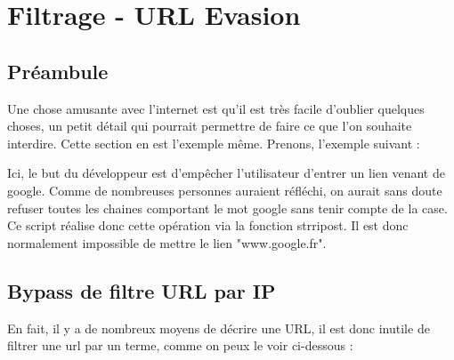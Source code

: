 \documentclass{article}
\begin{document}
\newpage
\section{Filtrage - URL Evasion}
\subsection{Préambule}
Une chose amusante avec l'internet est qu'il est très facile d'oublier quelques choses, un petit détail qui pourrait permettre de faire ce que l'on souhaite interdire. Cette section en est l'exemple même. Prenons, l'exemple suivant :
\vspace{0.2cm}\\
\vspace{0.2cm}

Ici, le but du développeur est d'empêcher l'utilisateur d'entrer un lien venant de google. Comme de nombreuses personnes auraient réfléchi, on aurait sans doute refuser toutes les chaines comportant le mot google sans tenir compte de la case. Ce script réalise donc cette opération via la fonction strripost. Il est donc normalement impossible de mettre le lien "www.google.fr".

\subsection{Bypass de filtre URL par IP}

En fait, il y a de nombreux moyens de décrire une URL, il est donc inutile de filtrer une url par un terme, comme on peux le voir ci-dessous :
\vspace{0.2cm}\\
\vspace{0.2cm}
\end{document}
